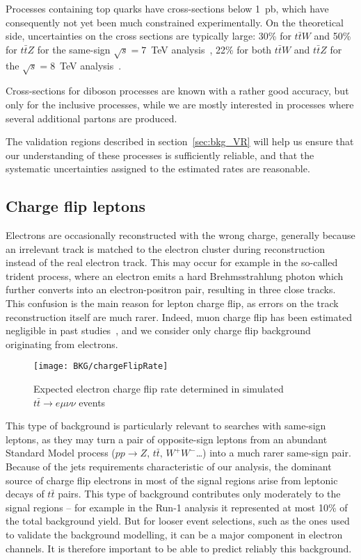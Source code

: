 Processes containing top quarks have cross-sections below 1~pb, which have consequently not yet been much constrained experimentally.
On the theoretical side, uncertainties on the cross sections are typically large: 30\% for $t\bar{t}W$ and 50\% for $t\bar{t}Z$
for the same-sign $\sqrt{s}=7$~TeV analysis~\cite{NoteSS3L_7TeV}, 22\% for both $t\bar{t}W$ and $t\bar{t}Z$ for the $\sqrt{s}=8$~TeV analysis~\cite{noteSS3L}. 

Cross-sections for diboson processes are known with a rather good accuracy, but only for the inclusive processes, 
while we are mostly interested in processes where several additional partons are produced. 

The validation regions described in section~\ref{sec:bkg_VR} will help us ensure that our understanding of these processes is sufficiently reliable, 
and that the systematic uncertainties assigned to the estimated rates are reasonable. 

\subsection{Charge flip leptons}
\label{sec:bkg_chflips}


Electrons are occasionally reconstructed with the wrong charge, 
generally because an irrelevant track is matched to the electron cluster during reconstruction instead of the real electron track. 
This may occur for example in the so-called trident process, where an electron emits a hard Brehmsstrahlung photon 
which further converts into an electron-positron pair, resulting in three close tracks. 
This confusion is the main reason for lepton charge flip, as errors on the track reconstruction itself are much rarer. 
Indeed, muon charge flip has been estimated negligible in past studies~\cite{noteSS3L}, and we consider only charge flip background originating from electrons. 

\begin{figure}[hbt]
\centering
\texttt{[image: BKG/chargeFlipRate]}
\caption{Expected electron charge flip rate determined in simulated $t\bar{t}\to e\mu\nu\nu$ events}
\label{fig:mc_chargeflip_rate}
\end{figure}


This type of background is particularly relevant to searches with same-sign leptons, 
as they may turn a pair of opposite-sign leptons from an abundant Standard Model process ($pp\to Z,\,t\bar{t},\,W^+W^-$\ldots) 
into a much rarer same-sign pair.
Because of the jets requirements characteristic of our analysis, 
the dominant source of charge flip electrons in most of the signal regions arise from leptonic decays of $t\bar{t}$ pairs. 
This type of background contributes only moderately to the signal regions -- for example in the Run-1 analysis it represented at most 10\% of the total background yield. 
But for looser event selections, such as the ones used to validate the background modelling, it can be a major component in electron channels. 
It is therefore important to be able to predict reliably this background. 

